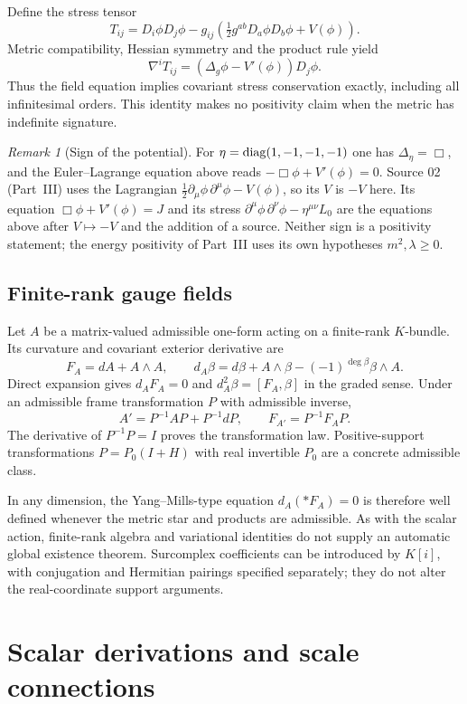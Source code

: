 \documentclass[11pt,letterpaper]{article}
\theoremstyle{definition}
\theoremstyle{remark}
\newtheorem{remark}[theorem]{Remark}
\begin{document}
Define the stress tensor
\[
 T_{ij}=D_i\phi D_j\phi-
 g_{ij}\left(\tfrac12g^{ab}D_a\phi D_b\phi+V(\phi)\right).
\]
Metric compatibility, Hessian symmetry and the product rule yield
\[
 \nabla^iT_{ij}=(\Delta_g\phi-V'(\phi))D_j\phi.
\]
Thus the field equation implies covariant stress conservation exactly,
including all infinitesimal orders. This identity makes no positivity claim
when the metric has indefinite signature.

\begin{remark}[Sign of the potential]\label{vtf:rem:potentialsign}
For $\eta=\operatorname{diag}(1,-1,-1,-1)$ one has $\Delta_\eta=\Box$, and the
Euler--Lagrange equation above reads $-\Box\phi+V'(\phi)=0$. Source 02
(Part~III) uses the Lagrangian $\tfrac12\partial_\mu\phi\,\partial^\mu\phi-V(\phi)$,
so its $V$ is $-V$ here. Its equation $\Box\phi+V'(\phi)=J$ and its stress
$\partial^\mu\phi\,\partial^\nu\phi-\eta^{\mu\nu}L_0$ are the equations above
after $V\mapsto-V$ and the addition of a source. Neither sign is a positivity
statement; the energy positivity of Part~III uses its own hypotheses
$m^2,\lambda\ge0$.
\end{remark}

\subsection{Finite-rank gauge fields}

Let $A$ be a matrix-valued admissible one-form acting on a finite-rank
$K$-bundle. Its curvature and covariant exterior derivative are
\[
 F_A=dA+A\wedge A,\qquad
 d_A\beta=d\beta+A\wedge\beta-(-1)^{\deg\beta}\beta\wedge A.
\]
Direct expansion gives $d_AF_A=0$ and $d_A^2\beta=[F_A,\beta]$ in the
graded sense. Under an admissible frame transformation $P$ with admissible
inverse,
\[
 A'=P^{-1}AP+P^{-1}dP,\qquad F_{A'}=P^{-1}F_AP.
\]
The derivative of $P^{-1}P=I$ proves the transformation law. Positive-support
transformations $P=P_0(I+H)$ with real invertible $P_0$ are a concrete
admissible class.

In any dimension, the Yang--Mills-type equation $d_A(*F_A)=0$ is therefore
well defined whenever the metric star and products are admissible. As with
the scalar action, finite-rank algebra and variational identities do not
supply an automatic global existence theorem. Surcomplex coefficients can
be introduced by $K[i]$, with conjugation and Hermitian pairings specified
separately; they do not alter the real-coordinate support arguments.

\section{Scalar derivations and scale connections}\label{vtf:sec:BM}
\end{document}
